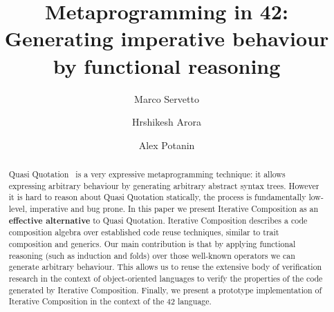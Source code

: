 \documentclass[runningheads]{llncs}
\begin{document}
%
\title{Metaprogramming in 42:
Generating imperative behaviour by functional reasoning}
%
%
\author{Marco Servetto %
\and
Hrshikesh Arora %
\and
Alex Potanin %
}
%
%
%
\maketitle              %
%
\begin{abstract}
Quasi Quotation~\cite{moggi1999idealized,pitman1980special,sheard2002template} is a very expressive metaprogramming technique: it allows expressing arbitrary behaviour by
generating arbitrary abstract syntax trees.
However it is hard to reason about Quasi Quotation statically,
the process is fundamentally low-level, imperative and bug prone.
In this paper we present Iterative Composition as
an \textbf{effective alternative} to Quasi Quotation.
Iterative Composition describes a code composition algebra over established code reuse techniques,
similar to trait composition and generics.
Our main contribution is that by applying functional reasoning (such as induction and folds)
over those well-known operators we can generate arbitrary behaviour.
This allows us to reuse the extensive body of verification research in the 
context of object-oriented languages to verify the properties
of the code generated by Iterative Composition.
Finally, we present a prototype implementation of Iterative Composition in the context of the 42 language.


%
%
%


\end{abstract}
\end{document}
